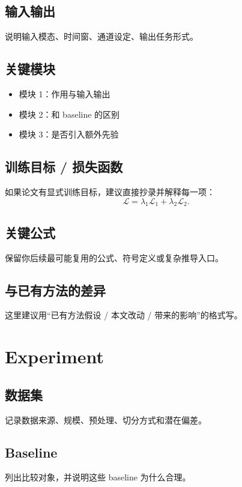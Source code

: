 \documentclass[UTF8,fontset=fandol,zihao=-4]{ctexart}
\begin{document}
\subsection{输入输出}
说明输入模态、时间窗、通道设定、输出任务形式。

\subsection{关键模块}
\begin{itemize}
  \item 模块 1：作用与输入输出
  \item 模块 2：和 baseline 的区别
  \item 模块 3：是否引入额外先验
\end{itemize}

\subsection{训练目标 / 损失函数}
如果论文有显式训练目标，建议直接抄录并解释每一项：
\begin{equation}
\mathcal{L} = \lambda_1 \mathcal{L}_1 + \lambda_2 \mathcal{L}_2.
\end{equation}

\subsection{关键公式}
保留你后续最可能复用的公式、符号定义或复杂推导入口。

\subsection{与已有方法的差异}
这里建议用“已有方法假设 / 本文改动 / 带来的影响”的格式写。

\section{Experiment}

\subsection{数据集}
记录数据来源、规模、预处理、切分方式和潜在偏差。

\subsection{Baseline}
列出比较对象，并说明这些 baseline 为什么合理。
\end{document}
